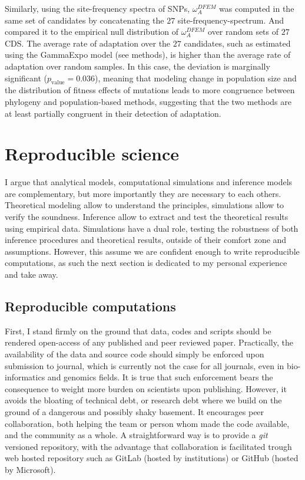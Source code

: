 Similarly, using the site-frequency spectra of SNPs, $\omega_A^{DFEM}$ was computed in the same set of candidates by concatenating the $27$ site-frequency-spectrum. And compared it to the empirical null distribution of $\omega_A^{DFEM}$ over random sets of $27$ CDS.
The average rate of adaptation over the $27$ candidates, such as estimated using the GammaExpo model (see methods), is higher than the average rate of adaptation over random samples. In this case, the deviation is marginally significant ($p_{\mathrm{value}}=0.036$),
meaning that modeling change in population size and the distribution of fitness effects of mutations leads to more congruence between phylogeny and population-based methods, suggesting that the two methods are at least partially congruent in their detection of adaptation.


\section{Reproducible science}

I argue that analytical models, computational simulations and inference models are complementary, but more importantly they are necessary to each others. 
Theoretical modeling allow to understand the principles, simulations allow to verify the soundness.
Inference allow to extract and test the theoretical results using empirical data.
Simulations have a dual role, testing the robustness of both inference procedures and theoretical results, outside of their comfort zone and assumptions.
However, this assume we are confident enough to write reproducible computations, as such the next section is dedicated to my personal experience and take away.

\subsection{Reproducible computations}

First, I stand firmly on the ground that data, codes and scripts should be rendered open-access of any published and peer reviewed paper.
Practically, the availability of the data and source code should simply be enforced upon submission to journal, which is currently not the case for all journals, even in bio-informatics and genomics fields.
It is true that such enforcement bears the consequence to weight more burden on scientists upon publishing.
However, it avoids the bloating of technical debt, or research debt where we build on the ground of a dangerous and possibly shaky basement.
It encourages peer collaboration, both helping the team or person whom made the code available, and the community as a whole.
A straightforward way is to provide a \textit{git} versioned repository, with the advantage that collaboration is facilitated trough web hosted repository such as GitLab (hosted by institutions) or GitHub (hosted by Microsoft).

